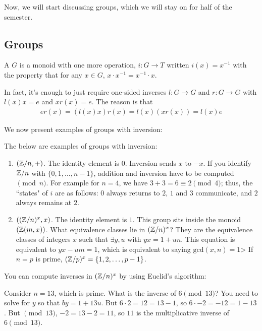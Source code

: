 \documentclass[12pt]{scrartcl}
\begin{document}
Now, we will start discussing groups, which we will stay on for half of the semester.

\subsection{Groups}
\begin{definition}
    A  $G$ is a monoid with one more operation, $i : G \to T$ written $i(x) = x^{-1}$ with the property that for any $x \in G$, $x \cdot x^{-1} = x^{-1} \cdot x$.
\end{definition}

In fact, it's enough to just require one-sided inverses $l : G \to G$ and $r : G \to G$ with $l(x)x = e$ and $xr(x) = e$. The reason is that
    \begin{align*}
        er(x) = (l(x)x)r(x) = l(x)(xr(x)) = l(x)e
    \end{align*}

We now present examples of groups with inversion:

\begin{example}
    The below are examples of groups with inversion:
    \begin{enumerate}
        \item $(\mathbb Z / n, +)$. The identity element is $0$. Inversion sends $x$ to $-x$. If you identify $\mathbb Z / n $ with $\{0, 1, \ldots, n-1\}$, addition and inversion have to be computed $\pmod n$. For example for $n = 4$, we have $3 + 3 = 6 \equiv 2 \pmod 4$; thus, the ``states" of $i$ are as follows: $0$ always returns to $2$, $1$ and $3$ communicate, and $2$ always remains at $2$.

        \item $((\mathbb Z / n)^x, x)$. The identity element is $1$. This group sits inside the monoid $(\mathbb Z(m, x))$. What equivalence classes lie in $(\mathbb Z / n)^x$? They are the equivalence classes of integers $x$ such that $\exists y, u$ with $yx = 1 + un$. This equation is equivalent to $yx-um = 1$, which is equivalent to saying $\text{gcd}(x, n) = 1$> If $n=p$ is prime, $(\mathbb Z / p)^x = \{1, 2, \ldots, p-1\}$.
    \end{enumerate}
\end{example}

You can compute inverses in $(\mathbb Z / n)^x$ by using Euclid's algorithm:

\begin{example}
    Consider $n = 13$, which is prime. What is the inverse of $6 \pmod {13}$? You need to solve for $y$ so that $by = 1 + 13u$. But $6 \cdot 2 = 12 = 13 - 1$, so $6 \cdot -2 = -12 = 1 - 13$. But $\pmod {13}$, $-2 = 13 - 2 = 11$, so $11$ is the multiplicative inverse of $6 \pmod {13}$.
\end{example}
\end{document}
